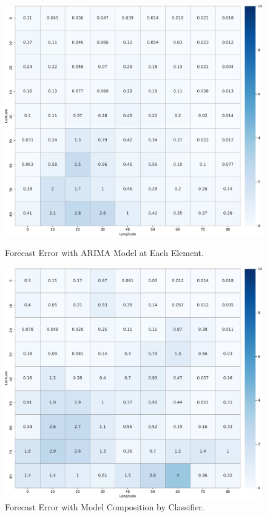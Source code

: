\begin{figure}[!tbp]
  \centering
    \begin{minipage}[b]{0.45\textwidth}
    \includegraphics[width=\textwidth]{../Figures/query_10x10_solver-each-1000dpi}
    \caption{Forecast Error with ARIMA Model at Each Element.}
    \label{Fig:model_composition_each}
  \end{minipage}
  \hfill
    \begin{minipage}[b]{0.45\textwidth}
    \includegraphics[width=\textwidth]{../Figures/query_10x10_solver-multiclass-1000dpi}
    \caption{Forecast Error with Model Composition by Classifier.}
    \label{Fig:model_composition_classifier}
  \end{minipage}
\end{figure}

